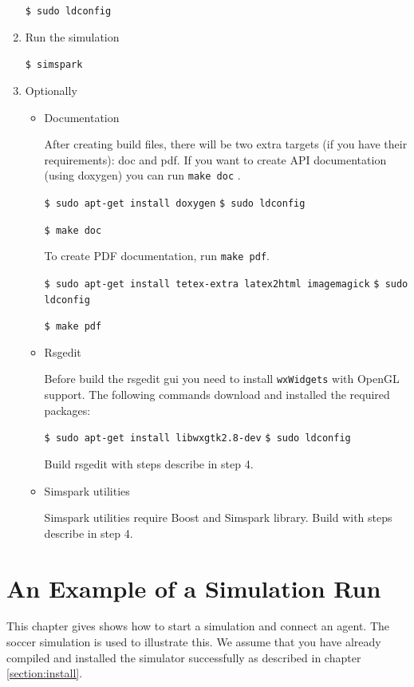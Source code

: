 \begin{enumerate}
\texttt{\$ sudo ldconfig}

\item Run the simulation

\texttt{\$ simspark}

\item Optionally

\begin{itemize}
\item Documentation

After creating build files, there will be two extra targets (if you have their requirements): doc and pdf. If you want to create API documentation (using doxygen) you can run \texttt{make doc} .

\texttt{\$ sudo apt-get install doxygen}
\texttt{\$ sudo ldconfig}

\texttt{\$ make doc}

To create PDF documentation, run \texttt{make pdf}.

\texttt{\$ sudo apt-get install tetex-extra latex2html imagemagick}
\texttt{\$ sudo ldconfig}

\texttt{\$ make pdf}

\item Rsgedit

Before build the rsgedit gui you need to install \texttt{wxWidgets} with OpenGL support. The following commands download and installed the required packages:

\texttt{\$ sudo apt-get install libwxgtk2.8-dev}
\texttt{\$ sudo ldconfig}

Build rsgedit with steps describe in step 4.

\item Simspark utilities

Simspark utilities require Boost and Simspark library. Build with steps describe in step 4.

\end{itemize}
\end{enumerate}

\section{An Example of a Simulation Run}

This chapter gives shows how to start a simulation and connect an
agent. The soccer simulation is used to illustrate this. We assume
that you have already compiled and installed the simulator successfully
as described in chapter \ref{section:install}. 

